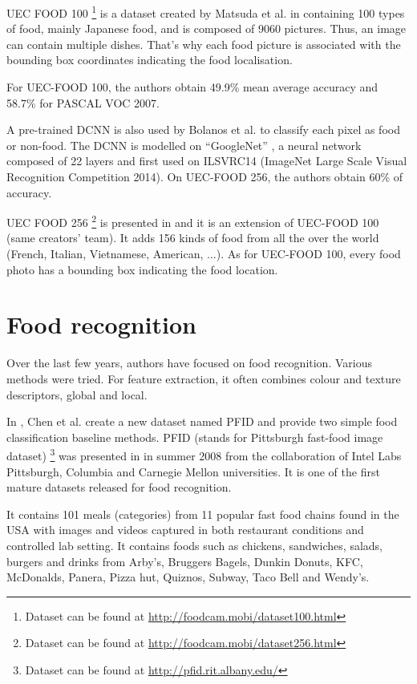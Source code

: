 UEC FOOD 100 \footnote{Dataset can be found at \url{http://foodcam.mobi/dataset100.html}} is a dataset created by Matsuda et al. in \cite{Matsuda2012a} containing 100 types of food, mainly Japanese food, and is composed of 9060 pictures. Thus, an image can contain multiple dishes. That's why each food picture is associated with the bounding box coordinates indicating the food localisation.

For UEC-FOOD 100, the authors obtain 49.9\% mean average accuracy and 58.7\% for PASCAL VOC 2007.

A pre-trained DCNN is also used by Bolanos et al. \cite{Bolanos2016} to classify each pixel as food or non-food. The DCNN is modelled on \enquote{GoogleNet} \cite{Szegedy2015}, a neural network composed of 22 layers and first used on ILSVRC14 (ImageNet Large Scale Visual Recognition Competition 2014). On UEC-FOOD 256, the authors obtain 60\% of accuracy.

UEC FOOD 256 \footnote{Dataset can be found at \url{http://foodcam.mobi/dataset256.html}} is presented in \cite{Kawano2015} and it is an extension of UEC-FOOD 100 (same creators' team). It adds 156 kinds of food from all the over the world (French, Italian, Vietnamese, American, ...). As for UEC-FOOD 100, every food photo has a bounding box indicating the food location.

\section{Food recognition}

Over the last few years, authors have focused on food recognition. Various methods were tried. For feature extraction, it often combines colour and texture descriptors, global and local.

In \cite{Chen2009}, Chen et al. create a new dataset named PFID and provide two simple food classification baseline methods. PFID (stands for Pittsburgh fast-food image dataset) \footnote{Dataset can be found at \url{http://pfid.rit.albany.edu/}} was presented in \cite{Chen2009} in summer 2008 from the collaboration of Intel Labs Pittsburgh, Columbia and Carnegie Mellon universities. It is one of the first mature datasets released for food recognition.

It contains 101 meals (categories) from 11 popular fast food chains found in the USA with images and videos captured in both restaurant conditions and controlled lab setting. It contains foods such as chickens, sandwiches, salads, burgers and drinks from Arby's, Bruggers Bagels, Dunkin Donuts, KFC, McDonalds, Panera, Pizza hut, Quiznos, Subway, Taco Bell and Wendy's.

